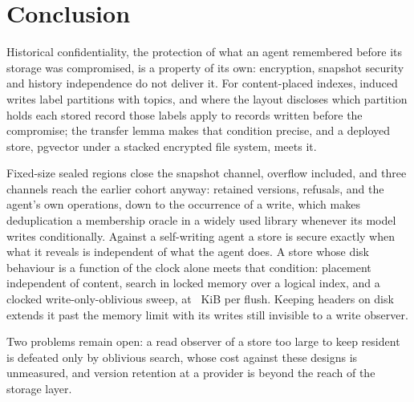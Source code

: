 \section{Conclusion}
\label{sec:conclusion}

Historical confidentiality, the protection of what an agent remembered before its storage was
compromised, is a property of its own: encryption, snapshot security and history independence do
not deliver it. For content-placed indexes, induced writes label partitions with topics, and where
the layout discloses which partition holds each stored record those labels apply to records written
before the compromise; the transfer lemma makes that condition precise, and a deployed store,
pgvector under a stacked encrypted file system, meets it.

Fixed-size sealed regions close the snapshot channel, overflow included, and three channels reach
the earlier cohort anyway: retained versions, refusals, and the agent's own operations, down to the
occurrence of a write, which makes deduplication a membership oracle in a widely used library
whenever its model writes conditionally. Against
a self-writing agent a store is secure exactly when what it reveals is independent of what the agent
does. A store whose disk behaviour is a function of the clock alone meets that condition: placement independent of content, search in locked memory over a logical index, and a
clocked write-only-oblivious sweep, at \REtwentyoneSweepKiB~KiB per flush. Keeping headers on disk
extends it past the memory limit with its writes still invisible to a write observer.

Two problems remain open: a read observer of a store too large to keep resident is defeated only
by oblivious search, whose cost against these designs is unmeasured, and version retention at a
provider is beyond the reach of the storage layer.
